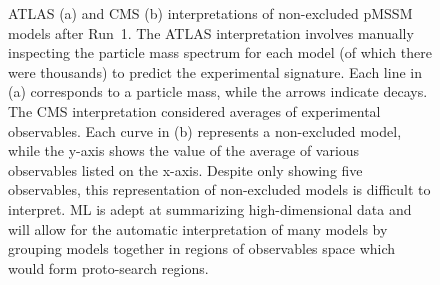 \documentclass[letter, USenglish, 11pt, subfigure]{article}
\begin{document}
\begin{figure}[!htbp]
  \centering
  \caption{\label{fig:cms_pMSSM} ATLAS (a) and CMS (b) interpretations of non-excluded pMSSM models after Run~1. The ATLAS interpretation involves manually inspecting the particle mass spectrum for each model (of which there were thousands) to predict the experimental signature. Each line in (a) corresponds to a particle mass, while the arrows indicate decays. The CMS interpretation considered averages of experimental observables. Each curve in (b) represents a non-excluded model, while the y-axis shows the value of the average of various observables listed on the x-axis. Despite only showing five observables, this representation of non-excluded models is difficult to interpret. ML is adept at summarizing high-dimensional data and will allow for the automatic interpretation of many models by grouping models together in regions of observables space which would form proto-search regions.}
\end{figure}
\end{document}
